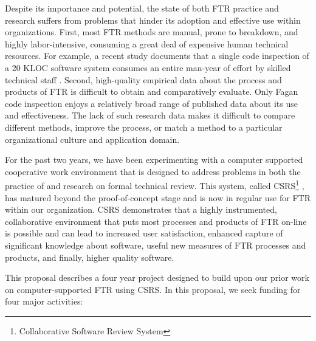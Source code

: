 Despite its importance and potential, the state of both FTR practice and
research suffers from problems that hinder its adoption and effective use
within organizations.  First, most FTR methods are manual, prone to
breakdown, and highly labor-intensive, consuming a great deal of expensive
human technical resources. For example, a recent study documents that a
single code inspection of a 20 KLOC software system consumes an entire
man-year of effort by skilled technical staff \cite{Russell91}.  Second,
high-quality empirical data about the process and products of FTR is
difficult to obtain and comparatively evaluate.  Only Fagan code inspection
enjoys a relatively broad range of published data about its use and
effectiveness.  The lack of such research data makes it difficult to
compare different methods, improve the process, or match a method to a
particular organizational culture and application domain.

For the past two years, we have been experimenting with a computer
supported cooperative work environment that is designed to address problems
in both the practice of and research on formal technical review.  This
system, called CSRS\footnote{Collaborative Software Review System}
\cite{csdl-92-07,csdl-93-07}, has matured beyond the proof-of-concept stage
and is now in regular use for FTR within our organization.  CSRS
demonstrates that a highly instrumented, collaborative environment that
puts most processes and products of FTR on-line is possible and can lead to
increased user satisfaction, enhanced capture of significant knowledge
about software, useful new measures of FTR processes and products, and
finally, higher quality software.

This proposal describes a four year project designed to build upon our 
prior work on computer-supported FTR using CSRS.  In this proposal, we seek
funding for four major activities:

